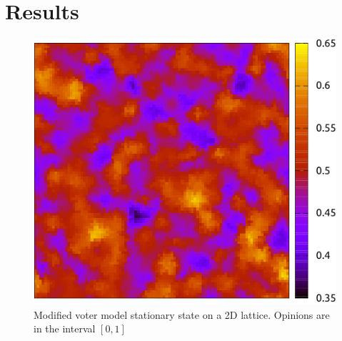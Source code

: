 \documentclass[11pt,a4paper,twocolumn]{article}
\begin{document}
\section*{Results}
\begin{figure}
\includegraphics[scale=1]{pictures/voter_mod-crop.pdf}
\caption{Modified voter model stationary state on a 2D lattice. Opinions are in the interval $[0,1]$}
\label{fig:voter.mod}
\end{figure}
\end{document}
